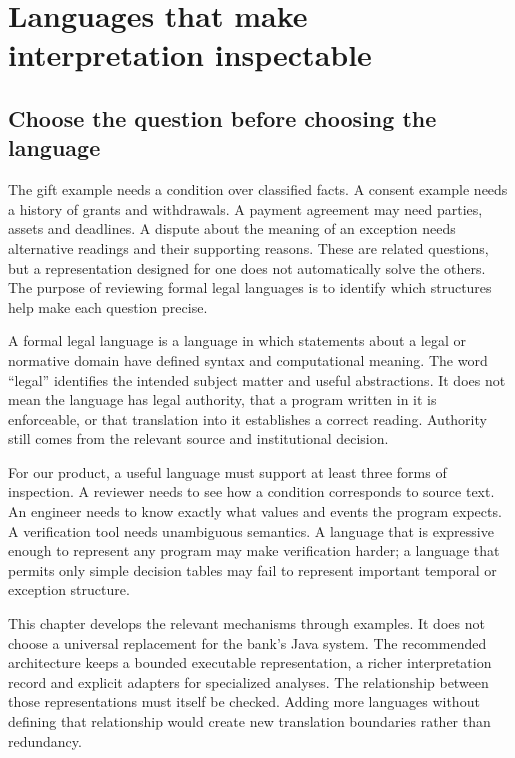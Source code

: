\chapter{Languages that make interpretation inspectable}
\label{ch:languages}

\section{Choose the question before choosing the language}
\label{merge:M04:00}

\label{sec:languages-question}
The gift example needs a condition over classified facts. A consent example
needs a history of grants and withdrawals. A payment agreement may need parties,
assets and deadlines. A dispute about the meaning of an exception needs
alternative readings and their supporting reasons. These are related questions,
but a representation designed for one does not automatically solve the others.
The purpose of reviewing formal legal languages is to identify which structures
help make each question precise.

A formal legal language is a language in which statements about a legal or
normative domain have defined syntax and computational meaning. The word
``legal'' identifies the intended subject matter and useful abstractions. It
does not mean the language has legal authority, that a program written in it
is enforceable, or that translation into it establishes a correct reading.
Authority still comes from the relevant source and institutional decision.


For our product, a useful language must support at least three forms of
inspection. A reviewer needs to see how a condition corresponds to source
text. An engineer needs to know exactly what values and events the program
expects. A verification tool needs unambiguous semantics. A language that is
expressive enough to represent any program may make verification harder; a
language that permits only simple decision tables may fail to represent
important temporal or exception structure.

This chapter develops the relevant mechanisms through examples. It does not
choose a universal replacement for the bank's Java system. The recommended
architecture keeps a bounded executable representation, a richer interpretation
record and explicit adapters for specialized analyses. The relationship between
those representations must itself be checked. Adding more languages without
defining that relationship would create new translation boundaries rather than
redundancy.

